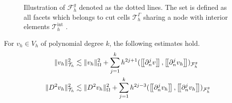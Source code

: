 \begin{figure}

\caption{Illustration of $\mathcal{F} _{h}^{g}$ denoted as the dotted lines. The set is defined as all facets which belongs to cut cells $\mathcal{T} ^{\Gamma }_{h}$ sharing a node with interior elements $\mathcal{T} ^{\mathrm{int}  }_{h}$ .  }
\label{fig:illustration_F_g}
\end{figure}





\begin{lemma}
    \label{lemma:bi_inv_gh_lemma}
    For $v_{h} \in  V_{h}$ of polynomial degree $k$, the following estimates hold.
        \begin{align}
            \label{eq:bi_inv_gh_1}
        \| v_h \|_{ \mathcal{T} _{h} }^{ 2 }  & \lesssim  \| v_h \|_{ \Omega  }^{ 2 }  + \sum_{j=1}^{k} h^{2j+1} ( \jump{ \partial ^{j}_{n} v }, \jump{ \partial ^{j}_{n} v_h}    )_{\mathcal{F}_{h}^{g}}\\
            \label{eq:bi_inv_gh_2}
        \| D ^2 v_h \|_{ \mathcal{T} _{h} }^{ 2 }  & \lesssim  \| D^2 v_h \|_{ \Omega  }^{ 2 }  + \sum_{j=1}^{k} h^{2j-3} ( \jump{ \partial ^{j}_{n} v_h }, \jump{ \partial ^{j}_{n}v_h }    )_{\mathcal{F}_{h}^{g}}
        \end{align}
\end{lemma}

